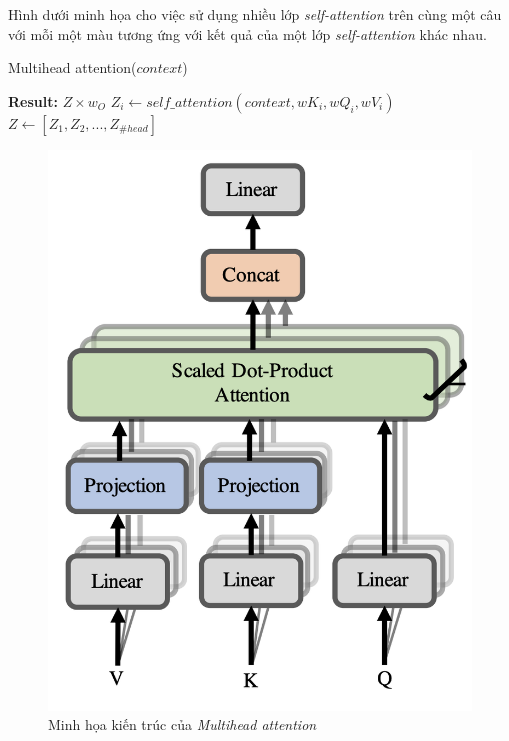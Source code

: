 Hình dưới minh họa cho việc sử dụng nhiều lớp \textit{self-attention} trên cùng một câu với mỗi một màu tương ứng với kết quả của một lớp \textit{self-attention} khác nhau.

\begin{algorithm}[H]
    \caption{Multihead attention($context$)}
    \begin{algorithmic}[1]
		\State \textbf{Result:} $Z \times w_O$
			\State $Z_i \gets self\_attention(context, wK_i, wQ_i, wV_i)$
		\EndFor
		\State $Z \gets [Z_1, Z_2,... ,Z_{\#head}]$
    \end{algorithmic}
\end{algorithm}

\begin{figure}[H]
    \begin{center}
        \includegraphics[scale=0.6]{images/multihead-attention}
        \caption{Minh họa kiến trúc của \textit{Multihead attention}\cite{lil.transformer}}
        \label{fig:multihead-attention}
    \end{center}
\end{figure}


